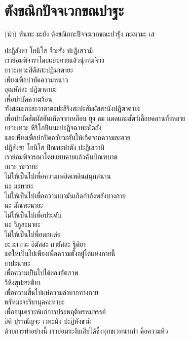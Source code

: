 \documentclass{article}
\begin{document}
\section{ตังขณิกปัจจเวกขณปาฐะ}
\begin{center}
(นำ) หันทะ มะยัง ตังขณิกกะปัจจะเวกขณะปาฐัง ภะณามะ เส
\end{center}
ปะฏิสังขา โยนิโส จีวะรัง ปะฏิเสวามิ\\
\indent เราย่อมพิจาราโดยแยบคายแล้วนุ่งห่มจีวร\\
ยาวะเทวะสีตัสสะปฏิฆาตายะ\\
\indent เพียงเพื่อบำบัดความหนาว\\
อุณหัสสะ ปฏิฆาตายะ\\
\indent เพื่อบำบัดความร้อน\\
ฑังสะมะกะสะวาตาตะปะสิริงสะปะสัมผัสสานังปฏิฆาตายะ\\
\indent เพื่อบำบัดสัมผัสอันเกิดจากเหลือบ ยุง ลม แดดและสัตว์เลื้อยคลานทั้งหลาย\\
ยาวะเทวะ หิริโกปินนะปะฏิจฉาทะนัตถัง\\
\indent และเพียงเพื่อปกปิดอวัยวะอันให้เกิดจากความละอาย\\
ปฏิสังขา โยนิโส ปิณฑะปาตัง ปะฏิเสวามิ\\
\indent เราย่อมพิจารณาโดยแยบคายแล้วฉันบิณฑบาต\\
เนวะ ทะวายะ\\
\indent ไม่ให้เป็นไปเพื่อความเพลิดเพลินสนุกสนาน\\
นะ มะทายะ\\
\indent ไม่ให้เป็นไปเพื่อความเมามันเกิดกำลังพลังทางกาย\\
นะ มัณฑะนายะ\\
\indent ไม่ให้เป็นไปเพื่อประดับ\\
นะ วิภูสะนายะ\\
\indent ไม่ให้เป็นไปพื่อตกแต่ง\\
ยะวะเทวะ อิมัสสะ กายัสสะ ฐิติยา\\
\indent แต่ให้เป็นไปเพียงเพื่อความตั้งอยู่ได้แห่งกายนี้\\
ยาปะนายะ\\
\indent เพื่อความเป็นไปได้ของอัตภาพ\\
วิหิงสุปะระติยา\\
\indent เพื่อความสิ้นไปแห่ความลำบากทางกาย\\
พรัหมะจะริยานุคคะหายะ\\
\indent เพื่ออนุเคราะห์แก่การประพฤติพรหมจรรย์\\
อิติ ปุราณัญจะ เวทะนัง ปะฏิหังขามิ\\
\indent ด้วยการทำอย่างนี้ เราย่อมระงับเสียได้ซึ่งทุกขเวทนาเก่า คือความหิว\\
\end{document}
